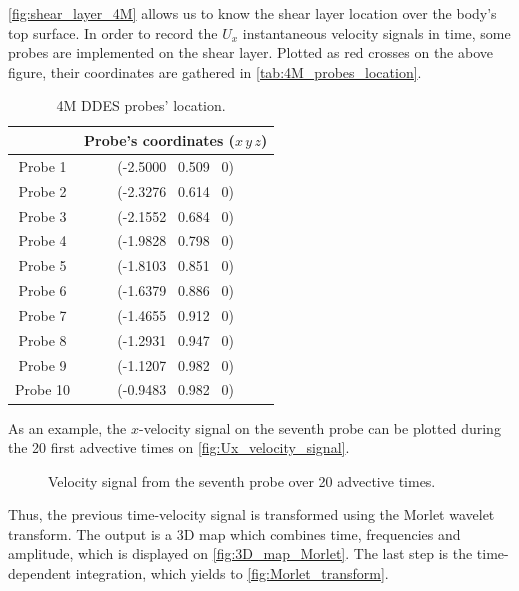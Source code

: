 \documentclass[12pt,twoside]{report}
\begin{document}
\autoref{fig:shear_layer_4M} allows us to know the shear layer location over the body's top surface. In order to record the $U_x$ instantaneous velocity signals in time, some probes are implemented on the shear layer. Plotted as red crosses on the above figure, their coordinates are gathered in \autoref{tab:4M_probes_location}. 
\begin{table}[h!]
    \centering
    \begin{tabular}{cc} \toprule[1.5pt]
        & \textbf{Probe's coordinates} ($x\, y\, z$) \\ \midrule[0.25pt]
            Probe 1 & (-2.5000 \, 0.509 \, 0) \\
            Probe 2 & (-2.3276 \, 0.614 \, 0) \\
            Probe 3 & (-2.1552 \, 0.684 \, 0) \\
            Probe 4 & (-1.9828 \, 0.798 \, 0) \\
            Probe 5 & (-1.8103 \, 0.851 \, 0) \\
            Probe 6 & (-1.6379 \, 0.886 \, 0) \\
            Probe 7 & (-1.4655 \, 0.912 \, 0) \\
            Probe 8 & (-1.2931 \, 0.947 \, 0) \\
            Probe 9 & (-1.1207 \, 0.982 \, 0) \\
            Probe 10 & (-0.9483 \, 0.982 \, 0) \\
        \bottomrule[1.5pt]
    \end{tabular}
    \caption{4M DDES probes' location.}
    \label{tab:4M_probes_location}
\end{table}

As an example, the $x$-velocity signal on the seventh probe can be plotted during the 20 first advective times on \autoref{fig:Ux_velocity_signal}.
\begin{figure}[h!]
    \centering
    
    \caption{Velocity signal from the seventh probe over 20 advective times.}
    \label{fig:Ux_velocity_signal}
\end{figure}

Thus, the previous time-velocity signal is transformed using the Morlet wavelet transform. The output is a 3D map which combines time, frequencies and amplitude, which is displayed on \autoref{fig:3D_map_Morlet}. The last step is the time-dependent integration, which yields to \autoref{fig:Morlet_transform}. 
\end{document}
